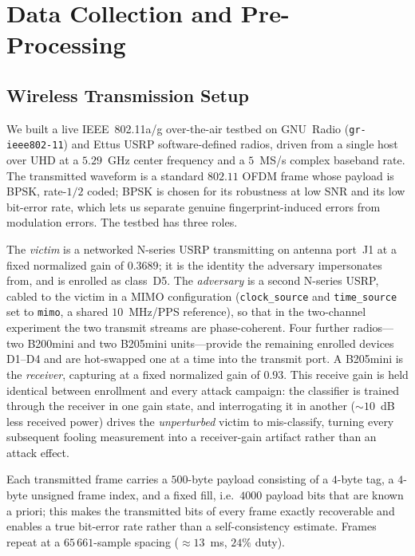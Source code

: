 \documentclass[11pt]{article}
\begin{document}

\section{Data Collection and Pre-Processing}

\subsection{Wireless Transmission Setup}
We built a live IEEE~802.11a/g over-the-air testbed on GNU~Radio (\texttt{gr-ieee802-11}) and
Ettus USRP software-defined radios, driven from a single host over UHD at a $5.29$~GHz center
frequency and a $5$~MS/s complex baseband rate. The transmitted waveform is a standard $802.11$
OFDM frame whose payload is BPSK, rate-$1/2$ coded; BPSK is chosen for its robustness at low SNR
and its low bit-error rate, which lets us separate genuine fingerprint-induced errors from
modulation errors. The testbed has three roles.

The \emph{victim} is a networked N-series USRP transmitting on antenna port~J1 at a fixed
normalized gain of $0.3689$; it is the identity the adversary impersonates from, and is enrolled
as class~D5. The \emph{adversary} is a second N-series USRP, cabled to the victim in a MIMO
configuration (\texttt{clock\_source} and \texttt{time\_source} set to \texttt{mimo}, a shared
$10$~MHz/PPS reference), so that in the two-channel experiment the two transmit streams are
phase-coherent. Four further radios---two B200mini and two B205mini units---provide the remaining
enrolled devices D1--D4 and are hot-swapped one at a time into the transmit port. A B205mini is the
\emph{receiver}, capturing at a fixed normalized gain of $0.93$. This receive gain is held
identical between enrollment and every attack campaign: the classifier is trained through the
receiver in one gain state, and interrogating it in another ($\sim\!10$~dB less received power)
drives the \emph{unperturbed} victim to mis-classify, turning every subsequent fooling measurement
into a receiver-gain artifact rather than an attack effect.

Each transmitted frame carries a $500$-byte payload consisting of a $4$-byte tag, a $4$-byte
unsigned frame index, and a fixed fill, i.e.\ $4000$ payload bits that are known a priori; this
makes the transmitted bits of every frame exactly recoverable and enables a true bit-error rate
rather than a self-consistency estimate. Frames repeat at a $65\,661$-sample spacing
($\approx\!13$~ms, $24\%$ duty).
\end{document}
